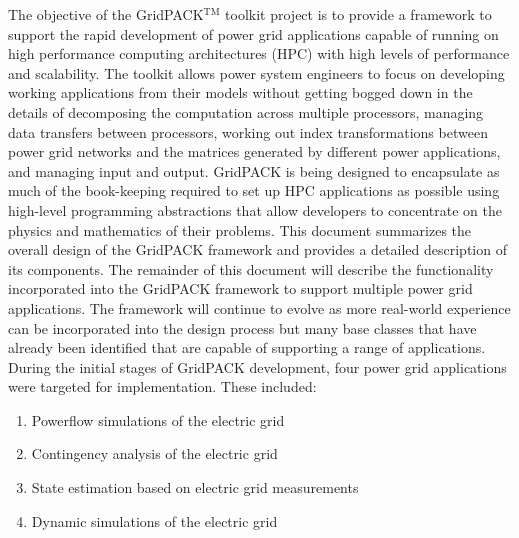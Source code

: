 \documentclass[12pt]{report} %
\begin{document}
The objective of the GridPACK$\mathrm{{}^{TM}}$ toolkit project is to provide a framework to support the rapid development of power grid applications capable of running on high performance computing architectures (HPC) with high levels of performance and scalability. The toolkit allows power system engineers to focus on developing working applications from their models without getting bogged down in the details of decomposing the computation across multiple processors, managing data transfers between processors, working out index transformations between power grid networks and the matrices generated by different power applications, and managing input and output. GridPACK is being designed to encapsulate as much of the book-keeping required to set up HPC applications as possible using high-level programming abstractions that allow developers to concentrate on the physics and mathematics of their problems.
This document summarizes the overall design of the GridPACK framework and provides a detailed description of its components. The remainder of this document will describe the functionality incorporated into the GridPACK framework to support multiple power grid applications. The framework will continue to evolve as more real-world experience can be incorporated into the design process but many base classes that have already been identified that are capable of supporting a range of applications.
During the initial stages of GridPACK development, four power grid applications were targeted for implementation. These included:
\begin{enumerate}
\item  Powerflow simulations of the electric grid

\item  Contingency analysis of the electric grid

\item  State estimation based on electric grid measurements

\item  Dynamic simulations of the electric grid
\end{enumerate}
\end{document}
